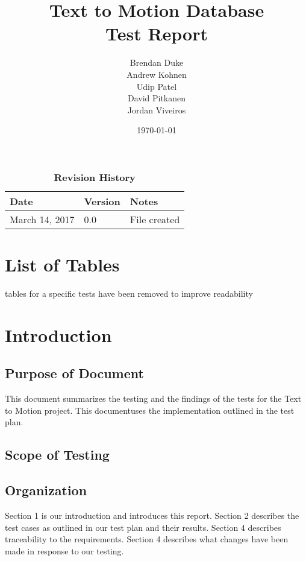 \documentclass{scrreprt}
\begin{document}
\title{\bf Text to Motion Database\\[\baselineskip]\Large Test Report}
\author{Brendan Duke\\Andrew Kohnen\\Udip Patel\\David Pitkanen\\Jordan Viveiros}
\date{\today}

\maketitle
\tableofcontents


\begin{table}[bp]
\caption*{\bf Revision History}
\begin{tabularx}{\textwidth}{p{3.5cm}p{2cm}X}
\toprule {\bf Date} & {\bf Version} & {\bf Notes}\\
\midrule
March 14, 2017 & 0.0 & File created\\
\bottomrule
\end{tabularx}
\end{table}

\newpage



\chapter{List of Tables}
    tables for a specific tests have been removed to improve readability

\chapter{Introduction}

\section{Purpose of Document}
    This document summarizes the testing and the findings of the tests for the Text to Motion project. This documentuses the implementation outlined in the test plan.

\section{Scope of Testing}

\section{Organization}
    Section 1 is our introduction and introduces this report. Section 2 describes the test cases as outlined in our test plan and their results. Section 4 describes traceability to the requirements. Section 4 describes what changes have been made in response to our testing.
\end{document}
